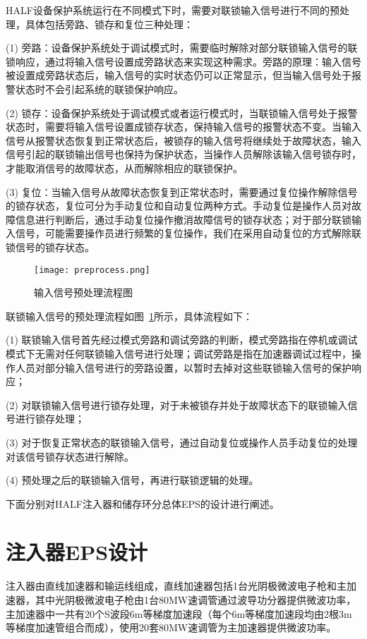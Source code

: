 HALF设备保护系统运行在不同模式下时，需要对联锁输入信号进行不同的预处理，具体包括旁路、锁存和复位三种处理\cite{chou2008}：

(1) 旁路：设备保护系统处于调试模式时，需要临时解除对部分联锁输入信号的联锁响应，通过将输入信号设置成旁路状态来实现这种需求。旁路的原理：输入信号被设置成旁路状态后，输入信号的实时状态仍可以正常显示，但当输入信号处于报警状态时不会引起系统的联锁保护响应。

(2) 锁存：设备保护系统处于调试模式或者运行模式时，当联锁输入信号处于报警状态时，需要将输入信号设置成锁存状态，保持输入信号的报警状态不变。当输入信号从报警状态恢复到正常状态后，被锁存的输入信号将继续处于故障状态，输入信号引起的联锁输出信号也保持为保护状态，当操作人员解除该输入信号锁存时，才能取消信号的故障状态，从而解除相应的联锁保护。

(3) 复位：当输入信号从故障状态恢复到正常状态时，需要通过复位操作解除信号的锁存状态，复位可分为手动复位和自动复位两种方式。手动复位是操作人员对故障信息进行判断后，通过手动复位操作撤消故障信号的锁存状态；对于部分联锁输入信号，可能需要操作员进行频繁的复位操作，我们在采用自动复位的方式解除联锁信号的锁存状态。

\begin{figure}[!htb]
	\centering
	\texttt{[image: preprocess.png]}
	\caption{输入信号预处理流程图}
	\label{fig:preprocess}
\end{figure}

联锁输入信号的预处理流程如图~\ref{fig:preprocess}所示，具体流程如下：

(1) 联锁输入信号首先经过模式旁路和调试旁路的判断，模式旁路指在停机或调试模式下无需对任何联锁输入信号进行处理；调试旁路是指在加速器调试过程中，操作人员对部分输入信号进行的旁路设置，以暂时去掉对这些联锁输入信号的保护响应；

(2) 对联锁输入信号进行锁存处理，对于未被锁存并处于故障状态下的联锁输入信号进行锁存处理；

(3) 对于恢复正常状态的联锁输入信号，通过自动复位或操作人员手动复位的处理对该信号锁存状态进行解除。

(4) 预处理之后的联锁输入信号，再进行联锁逻辑的处理。


下面分别对HALF注入器和储存环分总体EPS的设计进行阐述。

\section{注入器EPS设计}
\label{section:注入器EPS设计}
注入器由直线加速器和输运线组成，直线加速器包括1台光阴极微波电子枪和主加速器，其中光阴极微波电子枪由1台80MW速调管通过波导功分器提供微波功率，主加速器中一共有20个S波段6m等梯度加速段（每个6m等梯度加速段均由2根3m等梯度加速管组合而成），使用20套80MW速调管为主加速器提供微波功率。


